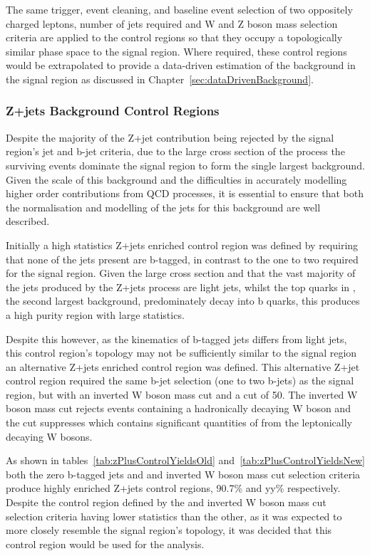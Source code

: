 The same trigger, event cleaning, and baseline event selection of two oppositely charged leptons, number of jets required and W and Z boson mass selection criteria are applied to the control regions so that they occupy a topologically similar phase space to the signal region.
Where required, these control regions would be extrapolated to provide a data-driven estimation of the background in the signal region as discussed in Chapter~\ref{sec:dataDrivenBackground}.

\subsubsection{Z+jets Background Control Regions}\label{subsec:zPlusJetsCR}
Despite the majority of the Z+jet contribution being rejected by the signal region's jet and b-jet criteria, due to the large cross section of the process the surviving events dominate the signal region to form the single largest background.
Given the scale of this background and the difficulties in accurately modelling higher order contributions from QCD processes, it is essential to ensure that both the normalisation and modelling of the jets for this background are well described.

Initially a high statistics Z+jets enriched control region was defined by requiring that none of the jets present are b-tagged, in contrast to the one to two required for the signal region.
Given the large cross section and that the vast majority of the jets produced by the Z+jets process are light jets, whilst the top quarks in \ttbar, the second largest background, predominately decay into b quarks, this produces a high purity region with large statistics.

Despite this however, as the kinematics of b-tagged jets differs from light jets, this control region's topology may not be sufficiently similar to the signal region an alternative Z+jets enriched control region was defined.
This alternative Z+jet control region required the same b-jet selection (one to two b-jets) as the signal region, but with an inverted W boson mass cut and a \MET cut of 50\GeV.
The inverted W boson mass cut rejects events containing a hadronically decaying W boson and the \MET cut suppresses \ttbar which contains significant quantities of \MET from the leptonically decaying W bosons.

As shown in tables~\ref{tab:zPlusControlYieldsOld} and~\ref{tab:zPlusControlYieldsNew} both the zero b-tagged jets and \MET and inverted W boson mass cut selection criteria produce highly enriched Z+jets control regions, 90.7\% and yy\% respectively.
Despite the control region defined by the \MET and inverted W boson mass cut selection criteria having lower statistics than the other, as it was expected to more closely resemble the signal region's topology, it was decided that this control region would be used for the analysis.

